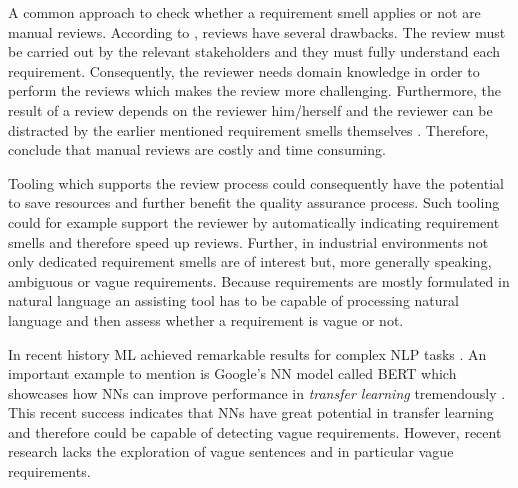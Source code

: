 A common approach to check whether a requirement smell applies or not are manual reviews.
According to \textcite{Salger:2013}, reviews have several drawbacks.
The review must be carried out by the relevant stakeholders and they must fully understand each requirement.
Consequently, the reviewer needs domain knowledge in order to perform the reviews which makes the review more challenging.
Furthermore, the result of a review depends on the reviewer him/herself \parencite{Zelkowitz:1983} and the reviewer can be distracted by the earlier mentioned requirement smells themselves \parencite{Femmer:2017}.
Therefore, \textcite{Femmer:2017} conclude that manual reviews are costly and time consuming.

Tooling which supports the review process could consequently have the potential to save resources and further benefit the quality assurance process.
Such tooling could for example support the reviewer by automatically indicating requirement smells and therefore speed up reviews.
Further, in industrial environments not only dedicated requirement smells are of interest but, more generally speaking, ambiguous or vague requirements.
Because requirements are mostly formulated in natural language \parencite{Mich:2004} an assisting tool has to be capable of processing natural language and then assess whether a requirement is vague or not.

In recent history \Ac{ML} achieved remarkable results for complex \ac{NLP} tasks \parencite{Khan:2016}.
An important example to mention is Google's \ac{NN} model called \ac{BERT} which showcases how \acp{NN} can improve performance in \textit{transfer learning} tremendously \parencite{Devlin:2018}.
This recent success indicates that \acp{NN} have great potential in transfer learning and therefore could be capable of detecting vague requirements.
However, recent research lacks the exploration of vague sentences and in particular vague requirements.

